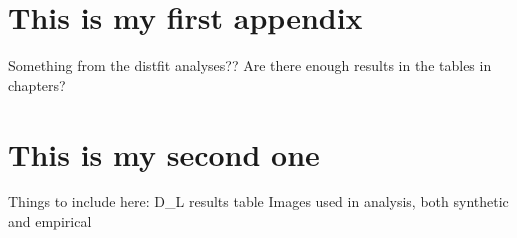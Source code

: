 \documentclass[
  12pt,
]{book}
\begin{document}
\hypertarget{this-is-my-first-appendix}{%
\chapter{This is my first appendix}\label{this-is-my-first-appendix}}

Something from the distfit analyses??
Are there enough results in the tables in chapters?

\hypertarget{this-is-my-second-one}{%
\chapter{This is my second one}\label{this-is-my-second-one}}

Things to include here:
D\_L results table
Images used in analysis, both synthetic and empirical
\end{document}
